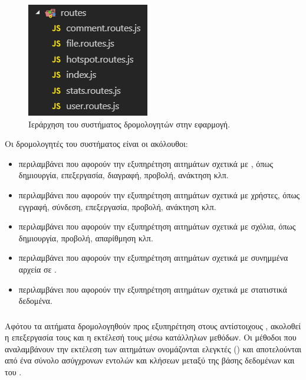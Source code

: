 \begin{figure}[h]
    \centering
    \includegraphics[scale=1]{figures/routes.png}
    \caption{Ιεράρχηση του συστήματος δρομολογητών στην εφαρμογή.}
    \label{routes}
\end{figure}

Οι δρομολογητές του συστήματος είναι οι ακόλουθοι:

\begin{itemize}
    \item {} περιλαμβάνει  που αφορούν την εξυπηρέτηση αιτημάτων σχετικά με , όπως δημιουργία, επεξεργασία, διαγραφή, προβολή, ανάκτηση κλπ.
    \item {} περιλαμβάνει  που αφορούν την εξυπηρέτηση αιτημάτων σχετικά με χρήστες, όπως εγγραφή, σύνδεση, επεξεργασία, προβολή, ανάκτηση κλπ.
    \item {} περιλαμβάνει  που αφορούν την εξυπηρέτηση αιτημάτων σχετικά με σχόλια, όπως δημιουργία, προβολή, απαρίθμηση κλπ.
    \item {} περιλαμβάνει  που αφορούν την εξυπηρέτηση αιτημάτων σχετικά με συνημμένα αρχεία σε .
    \item {} περιλαμβάνει  που αφορούν την εξυπηρέτηση αιτημάτων σχετικά με στατιστικά δεδομένα.
\end{itemize}

\subsubsection{}

Αφότου τα αιτήματα δρομολογηθούν προς εξυπηρέτηση στους αντίστοιχους , ακολοθεί η επεξεργασία τους και η εκτέλεσή τους μέσω κατάλληλων μεθόδων. Οι μέθοδοι που αναλαμβάνουν την εκτέλεση των αιτημάτων ονομάζονται ελεγκτές () και αποτελούνται από ένα σύνολο ασύγχρονων εντολών και κλήσεων μεταξύ της βάσης δεδομένων και του .

